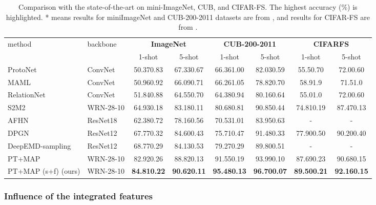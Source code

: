\documentclass[10pt, conference, compsocconf]{IEEEtran}
\begin{document}
\begin{table*}[t]
\centering
\caption{Comparison with the state-of-the-art on mini-ImageNet, CUB, and CIFAR-FS. The highest accuracy (\%) is highlighted. * means results for miniImageNet and CUB-200-2011 datasets are from \cite{chen2019closer}, and results for CIFAR-FS are from \cite{bertinetto2018meta}.}\begin{tabular}{l|l|cc||cc||cc}
\toprule
\multirow{2}{*}{method} & \multirow{2}{*}{backbone} & \multicolumn{2}{c||}{\bf{ImageNet}} & \multicolumn{2}{c||}{\bf{CUB-200-2011}} & \multicolumn{2}{c}{\bf{CIFARFS}}  \\
& & 1-shot& 5-shot& 1-shot& 5-shot& 1-shot& 5-shot\\ \hline

ProtoNet \cite{snell2017prototypical}& ConvNet&  50.370.83 & 67.330.67 & 66.361.00  & 82.030.59 & 55.50.70 & 72.00.60  \\
MAML \cite{finn2017model} & ConvNet&  50.960.92 & 66.090.71 & 66.261.05 & 78.820.70 & 58.91.9 & 71.51.0\\
RelationNet \cite{sung2018learning}& ConvNet&  51.840.88 & 64.550.70 & 64.380.94 & 80.160.64 & 55.01.0 & 72.00.60\\ \hline

S2M2 \cite{mangla2020charting}&WRN-28-10 & 64.930.18 &83.180.11 & 80.680.81 &90.850.44 & 74.810.19 &87.470.13 \\
AFHN \cite{li2020adversarial}& ResNet18  & 62.380.72 & 78.160.56 & 70.531.01 & 83.950.63 & - & -\\
DPGN \cite{yang2020dpgn}& ResNet12  & 67.770.32 & 84.600.43 & 75.710.47 & 91.480.33 & 77.900.50 & 90.200.40 \\
DeepEMD-sampling \cite{zhang2020deepemd}& ResNet12  & 68.770.29 & 84.130.53 & 79.270.29 & 89.800.51 & - & - \\
PT+MAP \cite{hu2020leveraging} & WRN-28-10 &82.920.26 & 88.820.13 &91.550.19 & 93.990.10 &87.690.23 & 90.680.15\\\hline
PT+MAP (s+f) (ours) &WRN-28-10  &{}{\bf{84.810.22}} & {}{\bf{90.620.11}} &{}{\bf{95.480.13}} & \bf{96.700.07} &{}{\bf{89.500.21}} & {}{\bf{92.160.15}} \\
\bottomrule

\end{tabular}
\label{table6}
\end{table*}

\subsubsection{Influence of the integrated features}
\end{document}
